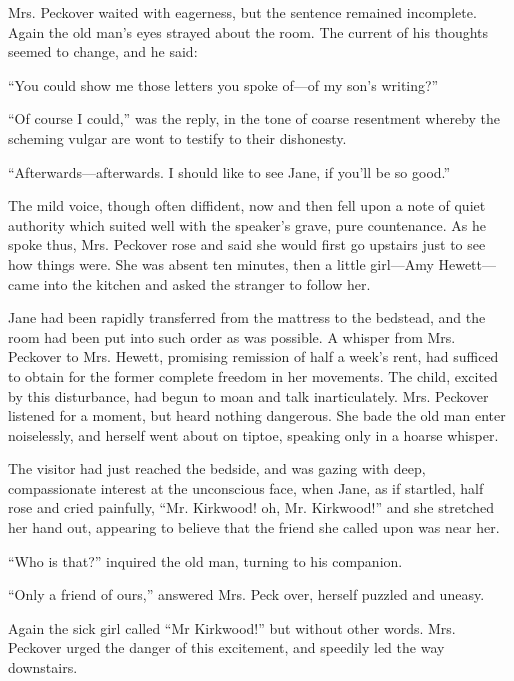 Mrs. Peckover waited with eagerness, but the sentence remained
incomplete. Again the old man's eyes strayed about the room. The current
of his thoughts seemed to change, and he said:

``You could show me those letters you spoke of---of my son's writing?''

``Of course I could,'' was the reply, in the tone of coarse resentment
whereby the scheming vulgar are wont to testify to their dishonesty.

``Afterwards---afterwards. I should like to see Jane, if you'll be so
good.''

The mild voice, though often diffident, now and then fell upon a note of
quiet authority which suited well with the speaker's grave, pure
countenance. As he spoke thus, Mrs. Peckover rose and said she would
first go upstairs just to see how things were. She was
{\protect\hypertarget{117}{}{}}absent ten minutes, then a little
girl---Amy Hewett---came into the kitchen and asked the stranger to
follow her.

Jane had been rapidly transferred from the mattress to the bedstead, and
the room had been put into such order as was possible. A whisper from
Mrs. Peckover to Mrs. Hewett, promising remission of half a week's rent,
had sufficed to obtain for the former complete freedom in her movements.
The child, excited by this disturbance, had begun to moan and talk
inarticulately. Mrs. Peckover listened for a moment, but heard nothing
dangerous. She bade the old man enter noiselessly, and herself went
about on tiptoe, speaking only in a hoarse whisper.

The visitor had just reached the bedside, and was gazing with deep,
compassionate interest at the unconscious face, when Jane, as if
startled, half rose and cried painfully, ``Mr. Kirkwood! oh, Mr.
Kirkwood!'' and she stretched her hand out, appearing to believe that
the friend she called upon was near her.

{\protect\hypertarget{118}{}{}}``Who is that?'' inquired the old man,
turning to his companion.

``Only a friend of ours,'' answered Mrs. Peck over, herself puzzled and
uneasy.

Again the sick girl called ``Mr Kirkwood!'' but without other words.
Mrs. Peckover urged the danger of this excitement, and speedily led the
way downstairs.
